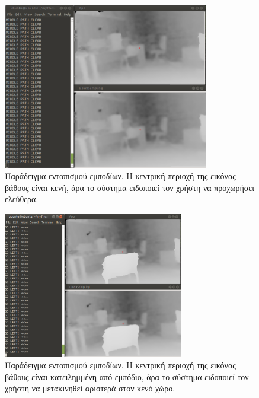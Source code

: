 \begin{figure}[H]
    \centering
    \includegraphics[width=0.8\textwidth]{images/test_depth_clear.png}
    \caption{Παράδειγμα εντοπισμού εμποδίων. Η κεντρική περιοχή της εικόνας βάθους είναι κενή, άρα το σύστημα ειδοποιεί τον χρήστη να προχωρήσει ελεύθερα.}
    \label{fig:test-depth-clear}
\end{figure}
\begin{figure}[H]
    \centering
    \includegraphics[width=0.7\textwidth]{images/test_depth_left.png}
    \caption{Παράδειγμα εντοπισμού εμποδίων. Η κεντρική περιοχή της εικόνας βάθους είναι κατειλημμένη από εμπόδιο, άρα το σύστημα ειδοποιεί τον χρήστη να μετακινηθεί αριστερά στον κενό χώρο.}
    \label{fig:test-depth-left}
\end{figure}
